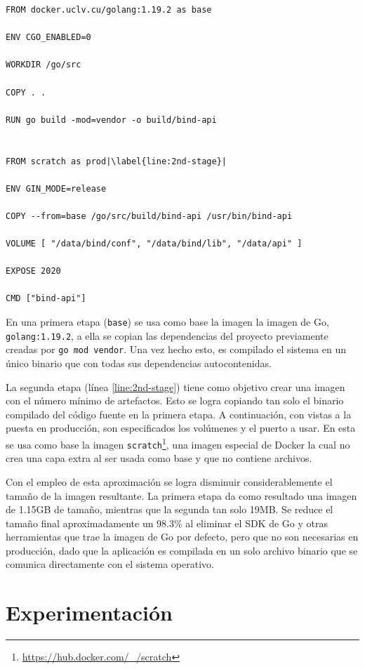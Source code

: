 \begin{lstlisting}[frame=single, escapechar=|, caption=Dockerfile para la API.]
FROM docker.uclv.cu/golang:1.19.2 as base

ENV CGO_ENABLED=0

WORKDIR /go/src

COPY . .

RUN go build -mod=vendor -o build/bind-api
    

FROM scratch as prod|\label{line:2nd-stage}|

ENV GIN_MODE=release

COPY --from=base /go/src/build/bind-api /usr/bin/bind-api

VOLUME [ "/data/bind/conf", "/data/bind/lib", "/data/api" ]

EXPOSE 2020

CMD ["bind-api"]
\end{lstlisting}

En una primera etapa (\verb|base|) se usa como base la imagen la imagen de Go, \verb|golang:1.19.2|, a ella se copian las dependencias del proyecto previamente creadas por \verb|go mod vendor|. Una vez hecho esto, es compilado el sistema en un único binario que con todas sus dependencias autocontenidas.

La segunda etapa (línea \ref{line:2nd-stage}) tiene como objetivo crear una imagen con el número mínimo de artefactos. Esto se logra copiando tan solo el binario compilado del código fuente en la primera etapa. A continuación, con vistas a la puesta en producción, son especificados los volúmenes y el puerto a usar. En esta se usa como base la imagen \verb|scratch|\footnote{\url{https://hub.docker.com/_/scratch}}, una imagen especial de Docker la cual no crea una capa extra al ser usada como base y que no contiene archivos.

Con el empleo de esta aproximación se logra disminuir considerablemente el tamaño de la imagen resultante. La primera etapa da como resultado una imagen de 1.15GB de tamaño, mientras que la segunda tan solo 19MB. Se reduce el tamaño final aproximadamente un 98.3\% al eliminar el SDK de Go y otras herramientas que trae la imagen de Go por defecto, pero que no son necesarias en producción, dado que la aplicación es compilada en un solo archivo binario que se comunica directamente con el sistema operativo.

\section{Experimentación}

